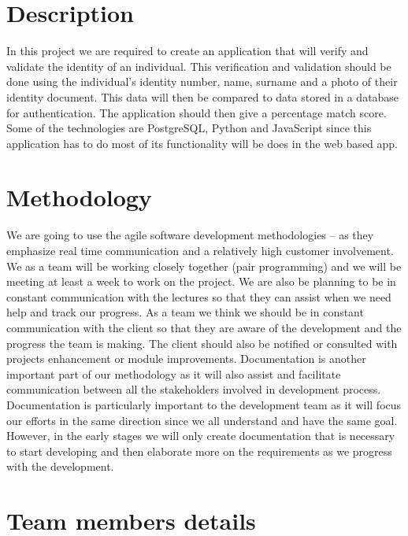 \documentclass[runningheads,a4paper]{article}
\begin{document}
	\section{Description} %
	In this project we are required to create an application that will verify and validate the identity of an individual. This verification and validation should be done using the individual’s identity number, name, surname and a photo of their identity document. This data will then be compared to data stored in a database for authentication. The application should then give a percentage match score. \\
Some of the technologies are PostgreSQL, Python and JavaScript since this application has to do most of its functionality will be does in the web based app.\\

  \section{Methodology} %
  We are going to use the agile software development methodologies – as they emphasize real time communication and a relatively high customer involvement. We as a team will be working closely together (pair programming) and we will be meeting at least a week to work on the project.  We are also be planning to be in constant communication with the lectures so that they can assist when we need help and track our progress. 
As a team we think we should be in constant communication with the client so that they are aware of the development and the progress the team is making. The client should also be notified or consulted with projects enhancement or module improvements.
Documentation is another important part of our methodology as it will also assist and facilitate communication between all the stakeholders involved in development process. Documentation is particularly important to the development team as it will focus our efforts in the same direction since we all understand and have the same goal. However, in the early stages we will only create documentation that is necessary to start developing and then elaborate more on the requirements as we progress with the development.
\\
  \section{Team members details}%
  
  
\end{document}
